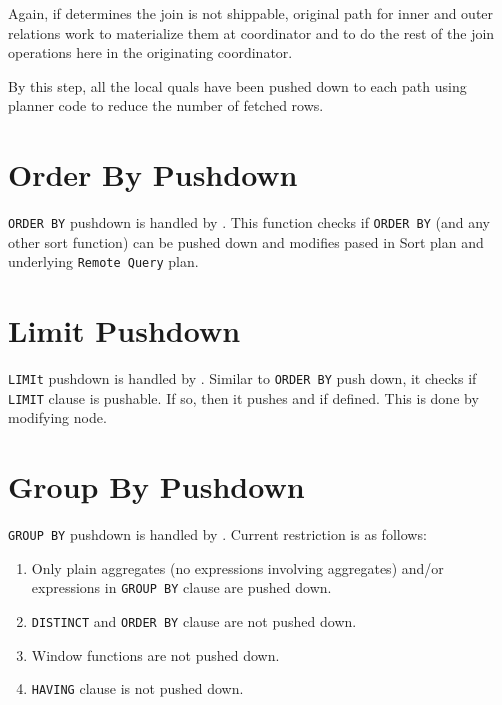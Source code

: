   Again, if  determines the join is not shippable, original path
  for inner and outer relations work to materialize them at coordinator and to do the rest of
  the join operations here in the originating coordinator.
  
  By this step, all the local quals have been pushed down to each path using \PG{} planner
  code to reduce the number of fetched rows.



\section{\label{sec:orderBy}Order By Pushdown}

  \texttt{ORDER BY} pushdown is handled by .
  This function checks if \texttt{ORDER BY} (and any other sort function) can be pushed down
  and modifies pased in Sort plan and underlying \texttt{Remote Query} plan.



\section{\label{sec:limit}Limit Pushdown}

  \texttt{LIMIt} pushdown is handled by .
  Similar to \texttt{ORDER BY} push down, it checks if \texttt{LIMIT} clause is pushable.
  If so, then it pushes  and  if defined.
  This is done by modifying  node.



\section{\label{sec:groupBy}Group By Pushdown}

  \texttt{GROUP BY} pushdown is handled by .
  Current restriction is as follows:

  \begin{enumerate}
  	  \item Only plain aggregates (no expressions involving aggregates) and/or expressions in
	  		\texttt{GROUP BY} clause are pushed down.
	  \item \texttt{DISTINCT} and \texttt{ORDER BY} clause are not pushed down.
	  \item Window functions are not pushed down.
	  \item \texttt{HAVING} clause is not pushed down.
  \end{enumerate}

